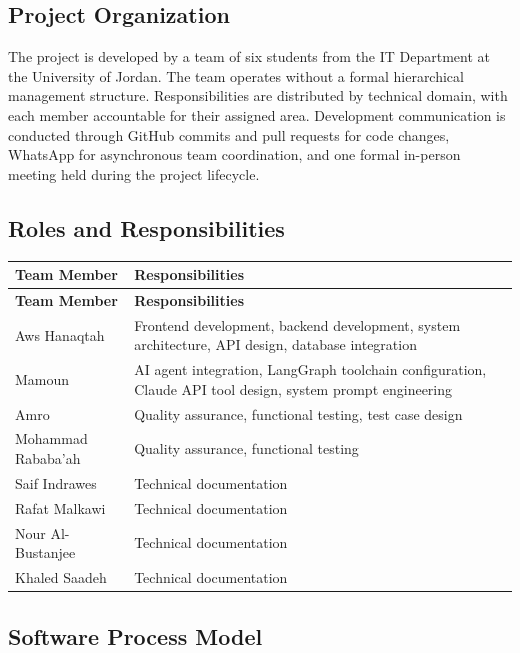 \documentclass[12pt,a4paper]{article}
\begin{document}
\subsection{Project Organization}

The project is developed by a team of six students from the IT Department at the
University of Jordan. The team operates without a formal hierarchical management
structure. Responsibilities are distributed by technical domain, with each member
accountable for their assigned area. Development communication is conducted through
GitHub commits and pull requests for code changes, WhatsApp for asynchronous team
coordination, and one formal in-person meeting held during the project lifecycle.

\subsection{Roles and Responsibilities}

\begin{longtable}{@{} L{4.5cm} L{10cm} @{}}
\toprule
\textbf{Team Member} & \textbf{Responsibilities} \\
\midrule
\endfirsthead
\toprule
\textbf{Team Member} & \textbf{Responsibilities} \\
\midrule
\endhead
\bottomrule
\endlastfoot
Aws Hanaqtah        & Frontend development, backend development, system architecture, API design, database integration \\[4pt]
Mamoun              & AI agent integration, LangGraph toolchain configuration, Claude API tool design, system prompt engineering \\[4pt]
Amro                & Quality assurance, functional testing, test case design \\[4pt]
Mohammad Rababa'ah  & Quality assurance, functional testing \\[4pt]
Saif Indrawes       & Technical documentation \\[4pt]
Rafat Malkawi       & Technical documentation \\[4pt]
Nour Al-Bustanjee   & Technical documentation \\[4pt]
Khaled Saadeh       & Technical documentation \\
\end{longtable}

\subsection{Software Process Model}
\end{document}
